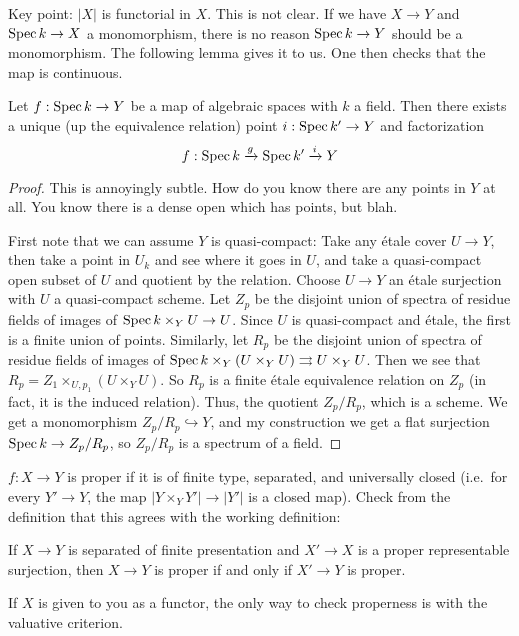 Key point: $|X|$ is functorial in $X$. This is not clear. If we have $X\to Y$ and $\operatorname{Spec}
 k\to X$ a monomorphism, there is no reason $\operatorname{Spec} k\to Y$ should be a monomorphism. The
 following lemma gives it to us. One then checks that the map is continuous.
 \begin{lemma}
   Let $f:\operatorname{Spec} k\to Y$ be a map of algebraic spaces with $k$ a field. Then there exists
   a unique (up the equivalence relation) point $i:\operatorname{Spec} k'\to Y$ and factorization
   \[
    f: \operatorname{Spec} k\xrightarrow g \operatorname{Spec} k'\xrightarrow i Y
   \]
 \end{lemma}
 \begin{proof}
   This is annoyingly subtle. How do you know there are any points in $Y$ at all. You
   know there is a dense open which has points, but blah.

   First note that we can assume $Y$ is quasi-compact: Take any \'etale cover $U\to Y$,
   then take a point in $U_k$ and see where it goes in $U$, and take a quasi-compact open
   subset of $U$ and quotient by the relation. Choose $U\to Y$ an \'etale surjection with
   $U$ a quasi-compact scheme. Let $Z_p$ be the disjoint union of spectra of residue
   fields of images of $\operatorname{Spec} k\times_Y U\to U$. Since $U$ is quasi-compact and \'etale,
   the first is a finite union of points. Similarly, let $R_p$ be the disjoint union of
   spectra of residue fields of images of $\operatorname{Spec} k\times_Y (U\times_Y U)\rightrightarrows
   U\times_Y U$. Then we see that $R_p=Z_1\times_{U,p_1} (U\times_Y U)$. So $R_p$ is a
   finite \'etale equivalence relation on $Z_p$ (in fact, it is the induced relation).
   Thus, the quotient $Z_p/R_p$, which is a scheme. We get a monomorphism
   $Z_p/R_p\hookrightarrow Y$, and my construction we get a flat surjection $\operatorname{Spec} k\to
   Z_p/R_p$, so $Z_p/R_p$ is a spectrum of a field.
 \end{proof}

 $f:X\to Y$ is proper if it is of finite type, separated, and universally closed
 (i.e.~for every $Y'\to Y$, the map $|Y\times_Y Y'|\to |Y'|$ is a closed map). Check from
 the definition that this agrees with the working definition:
 \begin{lemma}
   If $X\to Y$ is separated of finite presentation and $X'\to X$ is a proper
   representable surjection, then $X\to Y$ is proper if and only if $X'\to Y$ is proper.
 \end{lemma}

 If $X$ is given to you as a functor, the only way to check properness is with the
 valuative criterion.
